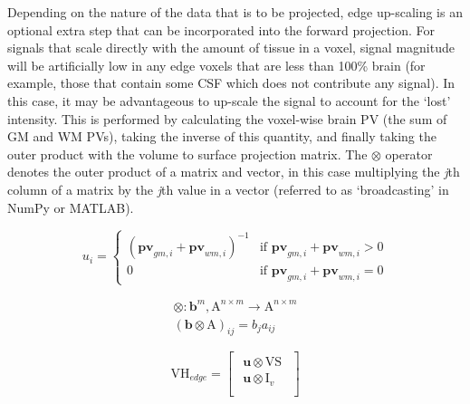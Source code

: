 \documentclass[12pt]{report}
\renewcommand{\vec}[1]{\mathbf{#1}}
\begin{document}
Depending on the nature of the data that is to be projected, edge up-scaling is an optional extra step that can be incorporated into the forward projection. For signals that scale directly with the amount of tissue in a voxel, signal magnitude will be artificially low in any edge voxels that are less than 100\% brain (for example, those that contain some CSF which does not contribute any signal). In this case, it may be advantageous to up-scale the signal to account for the `lost' intensity. This is performed by calculating the voxel-wise brain PV (the sum of GM and WM PVs), taking the inverse of this quantity, and finally taking the outer product with the volume to surface projection matrix. The $\otimes$ operator denotes the outer product of a matrix and vector, in this case multiplying the \textit{j}th column of a matrix by the \textit{j}th value in a vector (referred to as `broadcasting' in NumPy or MATLAB). 

\begin{equation}
u_{i} = 
\begin{cases}
(\vec{pv}_{gm,i} + \vec{pv}_{wm,i})^{-1} & \text{if } \vec{pv}_{gm,i} + \vec{pv}_{wm,i} > 0 \\ 
0 & \text{if } \vec{pv}_{gm,i} + \vec{pv}_{wm,i} = 0 
\end{cases}
\end{equation}

\begin{equation}
\begin{aligned}
\otimes : \vec{b}^m, \mathrm{A}^{n \times m} \rightarrow \mathrm{A}^{n \times m} \\
(\vec{b} \otimes \mathrm{A})_{ij} = b_{j} a_{ij} 
\end{aligned}
\end{equation}

\begin{equation}
\mathrm{VH}_{edge} =  \begin{bmatrix}
    \begin{array}{c}
  \vec{u} \otimes \mathrm{VS}  \\
  \hline
  \vec{u} \otimes \mathrm{I}_v \\
    \end{array}
  \end{bmatrix}
\end{equation}
\end{document}
